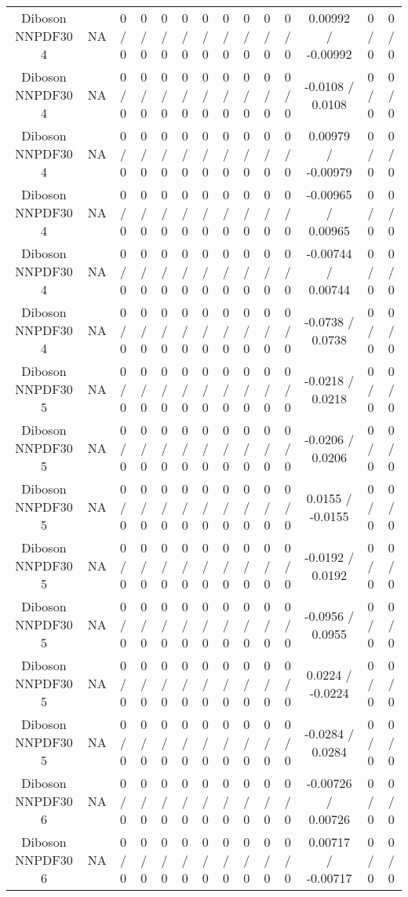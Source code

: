 \documentclass[10pt]{article}
\begin{document}
\begin{table}[htbp]
\begin{center}
\begin{tabular}{|c|c|c|c|c|c|c|c|c|c|c|c|c|c|}
  Diboson NNPDF30 4 &    NA    & 0 / 0 & 0 / 0 & 0 / 0 & 0 / 0 & 0 / 0 & 0 / 0 & 0 / 0 & 0 / 0 & 0 / 0 & 0.00992 / -0.00992 & 0 / 0 & 0 / 0 \\ 
  Diboson NNPDF30 4 &    NA    & 0 / 0 & 0 / 0 & 0 / 0 & 0 / 0 & 0 / 0 & 0 / 0 & 0 / 0 & 0 / 0 & 0 / 0 & -0.0108 / 0.0108 & 0 / 0 & 0 / 0 \\ 
  Diboson NNPDF30 4 &    NA    & 0 / 0 & 0 / 0 & 0 / 0 & 0 / 0 & 0 / 0 & 0 / 0 & 0 / 0 & 0 / 0 & 0 / 0 & 0.00979 / -0.00979 & 0 / 0 & 0 / 0 \\ 
  Diboson NNPDF30 4 &    NA    & 0 / 0 & 0 / 0 & 0 / 0 & 0 / 0 & 0 / 0 & 0 / 0 & 0 / 0 & 0 / 0 & 0 / 0 & -0.00965 / 0.00965 & 0 / 0 & 0 / 0 \\ 
  Diboson NNPDF30 4 &    NA    & 0 / 0 & 0 / 0 & 0 / 0 & 0 / 0 & 0 / 0 & 0 / 0 & 0 / 0 & 0 / 0 & 0 / 0 & -0.00744 / 0.00744 & 0 / 0 & 0 / 0 \\ 
  Diboson NNPDF30 4 &    NA    & 0 / 0 & 0 / 0 & 0 / 0 & 0 / 0 & 0 / 0 & 0 / 0 & 0 / 0 & 0 / 0 & 0 / 0 & -0.0738 / 0.0738 & 0 / 0 & 0 / 0 \\ 
  Diboson NNPDF30 5 &    NA    & 0 / 0 & 0 / 0 & 0 / 0 & 0 / 0 & 0 / 0 & 0 / 0 & 0 / 0 & 0 / 0 & 0 / 0 & -0.0218 / 0.0218 & 0 / 0 & 0 / 0 \\ 
  Diboson NNPDF30 5 &    NA    & 0 / 0 & 0 / 0 & 0 / 0 & 0 / 0 & 0 / 0 & 0 / 0 & 0 / 0 & 0 / 0 & 0 / 0 & -0.0206 / 0.0206 & 0 / 0 & 0 / 0 \\ 
  Diboson NNPDF30 5 &    NA    & 0 / 0 & 0 / 0 & 0 / 0 & 0 / 0 & 0 / 0 & 0 / 0 & 0 / 0 & 0 / 0 & 0 / 0 & 0.0155 / -0.0155 & 0 / 0 & 0 / 0 \\ 
  Diboson NNPDF30 5 &    NA    & 0 / 0 & 0 / 0 & 0 / 0 & 0 / 0 & 0 / 0 & 0 / 0 & 0 / 0 & 0 / 0 & 0 / 0 & -0.0192 / 0.0192 & 0 / 0 & 0 / 0 \\ 
  Diboson NNPDF30 5 &    NA    & 0 / 0 & 0 / 0 & 0 / 0 & 0 / 0 & 0 / 0 & 0 / 0 & 0 / 0 & 0 / 0 & 0 / 0 & -0.0956 / 0.0955 & 0 / 0 & 0 / 0 \\ 
  Diboson NNPDF30 5 &    NA    & 0 / 0 & 0 / 0 & 0 / 0 & 0 / 0 & 0 / 0 & 0 / 0 & 0 / 0 & 0 / 0 & 0 / 0 & 0.0224 / -0.0224 & 0 / 0 & 0 / 0 \\ 
  Diboson NNPDF30 5 &    NA    & 0 / 0 & 0 / 0 & 0 / 0 & 0 / 0 & 0 / 0 & 0 / 0 & 0 / 0 & 0 / 0 & 0 / 0 & -0.0284 / 0.0284 & 0 / 0 & 0 / 0 \\ 
  Diboson NNPDF30 6 &    NA    & 0 / 0 & 0 / 0 & 0 / 0 & 0 / 0 & 0 / 0 & 0 / 0 & 0 / 0 & 0 / 0 & 0 / 0 & -0.00726 / 0.00726 & 0 / 0 & 0 / 0 \\ 
  Diboson NNPDF30 6 &    NA    & 0 / 0 & 0 / 0 & 0 / 0 & 0 / 0 & 0 / 0 & 0 / 0 & 0 / 0 & 0 / 0 & 0 / 0 & 0.00717 / -0.00717 & 0 / 0 & 0 / 0 \\ 

\end{tabular}
\end{center}
\end{table}
\end{document}
